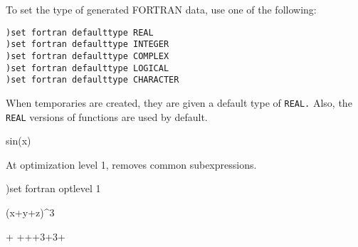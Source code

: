 To set the type of generated FORTRAN data,
use one of the following:
\begin{verbatim}
)set fortran defaulttype REAL
)set fortran defaulttype INTEGER
)set fortran defaulttype COMPLEX
)set fortran defaulttype LOGICAL
)set fortran defaulttype CHARACTER
\end{verbatim}

\begin{xtc}
\begin{xtccomment}
When temporaries are created, they are given a default type of
{\tt REAL.}
Also, the {\tt REAL} versions of functions are used by default.
\end{xtccomment}
\begin{spadsrc}
sin(x) 
\end{spadsrc}
\begin{TeXOutput}
\begin{fricasmath}{3}
%
\end{fricasmath}
\end{TeXOutput}
\end{xtc}
\begin{noOutputXtc}
\begin{xtccomment}
At optimization level 1, \Language{} removes common subexpressions.
\end{xtccomment}
\begin{spadsrc}
)set fortran optlevel 1 
\end{spadsrc}
\end{noOutputXtc}
\begin{xtc}
\begin{xtccomment}
\end{xtccomment}
\begin{spadsrc}
(x+y+z)^3 
\end{spadsrc}
\begin{TeXOutput}
\begin{fricasmath}{4}
+\TIMES %
+\TIMES {}++3\TIMES {}\TIMES {}+3\TIMES {}\TIMES {}+%
\end{fricasmath}
\end{TeXOutput}
\end{xtc}
